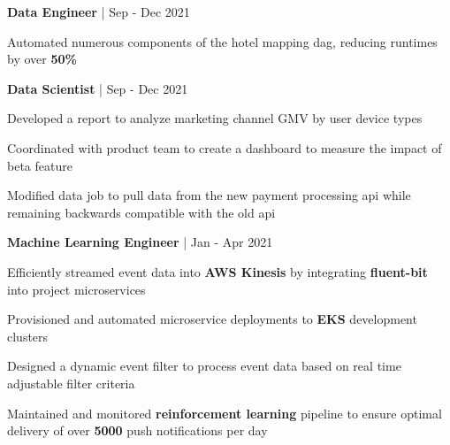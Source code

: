 


\begin{cventries}

\cventry
{\textbf{Data Engineer} | \color{awesome}{Super}}
{Sep - Dec 2021} %
{ %
\begin{cvitems}
\item {Automated numerous components of the hotel mapping dag, reducing runtimes by over \textbf{50\%}}
\end{cvitems}
}

\cventry
{\textbf{Data Scientist} | \color{awesome}{Shopify}}
{Sep - Dec 2021} %
{ %
\begin{cvitems}
\item {Developed a report to analyze marketing channel GMV by user device types}
\item {Coordinated with product team to create a dashboard to measure the impact of beta feature}
\item {Modified data job to pull data from the new payment processing api while remaining backwards compatible with the old api}
\end{cvitems}
}

\cventry
{\textbf{Machine Learning Engineer} | \color{awesome}{Zynga}}
{Jan - Apr 2021} %
{ %
\begin{cvitems}
\item {Efficiently streamed event data into \textbf{AWS Kinesis} by integrating \textbf{fluent-bit} into project microservices}
\item {Provisioned and automated microservice deployments to \textbf{EKS} development clusters}
\item {Designed a dynamic event filter to process event data based on real time adjustable filter criteria}
\item {Maintained and monitored \textbf{reinforcement learning} pipeline to ensure optimal delivery of over \textbf{5000} push notifications per day}
\end{cvitems}
}


\end{cventries}
